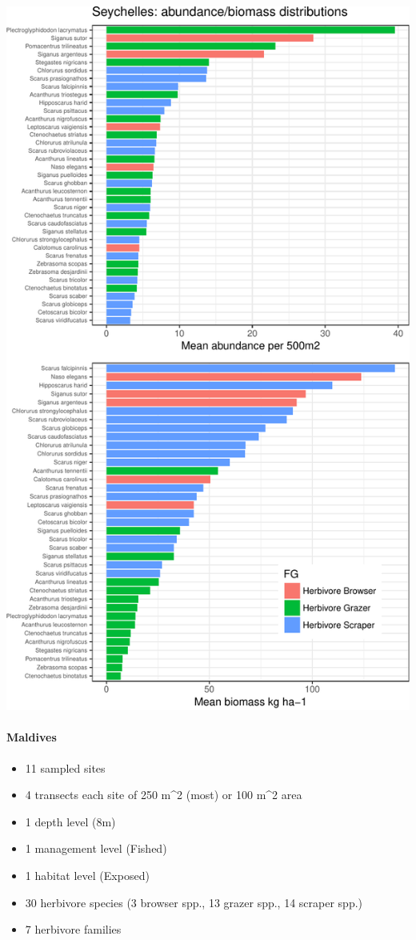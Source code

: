 \documentclass[]{article}
\providecommand{\tightlist}{%
  \setlength{\itemsep}{0pt}\setlength{\parskip}{0pt}}
\let\oldparagraph\paragraph
\renewcommand{\paragraph}[1]{\oldparagraph{#1}\mbox{}}
\begin{document}
\includegraphics{UVC-datasets-explore_files/figure-latex/unnamed-chunk-5-1.pdf}

\paragraph{Maldives}\label{maldives}

\begin{itemize}
\tightlist
\item
  11 sampled sites
\item
  4 transects each site of 250 m\^{}2 (most) or 100 m\^{}2 area
\item
  1 depth level (8m)
\item
  1 management level (Fished)
\item
  1 habitat level (Exposed)
\item
  30 herbivore species (3 browser spp., 13 grazer spp., 14 scraper spp.)
\item
  7 herbivore families
\end{itemize}
\end{document}
